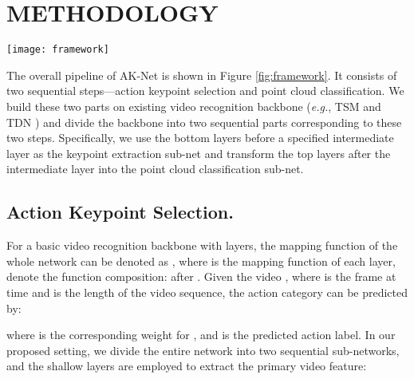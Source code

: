 \documentclass[journal]{IEEEtran}
\begin{document}
\section{METHODOLOGY}\label{sec:method}

\begin{figure*}[ht]
	\centering
	\texttt{[image: framework]}
	\caption{
	Overview of the proposed AK-Net. 
	It is built on the existing video recognition backbone and the whole network is divided into two parts.
	The first part aims to select action keypoints by utilizing the spatial-temporal heatmap.
	An auxiliary classification head is introduced to facilitate the optimization of all point features.
	Then a set of spatial-temporal points are selected via the score of the heatmap. 
	The selected action keypoints will be processed by the second part, which is composed of ranking, transform, and 1D convolution layers.
	}
	\label{fig:framework}
\end{figure*}

The overall pipeline of AK-Net is shown in Figure \ref{fig:framework}.
It consists of two sequential steps---action keypoint selection and point cloud classification.
We build these two parts on existing video recognition backbone (\emph{e.g.}, TSM \cite{lin2019tsm} and TDN \cite{wang2021tdn}) and divide the backbone into two sequential parts corresponding to these two steps. Specifically, we use the bottom layers before a specified intermediate layer as the keypoint extraction sub-net and transform the top layers after the intermediate layer into the point cloud classification sub-net. 



\subsection{Action Keypoint Selection.}
For a basic video recognition backbone with  layers, the mapping function of the whole network can be denoted as , where  is the mapping function of each layer,  denote the function composition:  after .
Given the video , where  is the frame at time  and  is the length of the video sequence, the action category can be predicted by:

where  is the corresponding weight for , and  is the predicted action label.
In our proposed setting, we divide the entire network into two sequential sub-networks, and the shallow layers are employed to extract the primary video feature:
\end{document}
